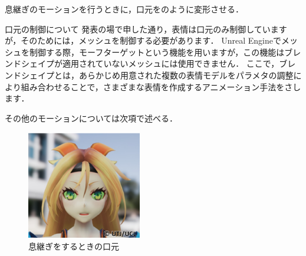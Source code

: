 息継ぎのモーションを行うときに，口元をのように変形させる．

口元の制御について
発表の場で申した通り，表情は口元のみ制御していますが，そのためには，メッシュを制御する必要があります．
Unreal Engineでメッシュを制御する際，モーフターゲットという機能を用いますが，この機能はブレンドシェイプが適用されていないメッシュには使用できません．
ここで，ブレンドシェイプとは，あらかじめ用意された複数の表情モデルをパラメタの調整により組み合わせることで，さまざまな表情を作成するアニメーション手法をさします．


その他のモーションについては次項で述べる．\\
\begin{figure}[h]
	\centering
	\includegraphics[width=5cm]{fig/chap3/breath.eps}
	\caption{息継ぎをするときの口元}
	\label{fig:breath}
\end{figure}

